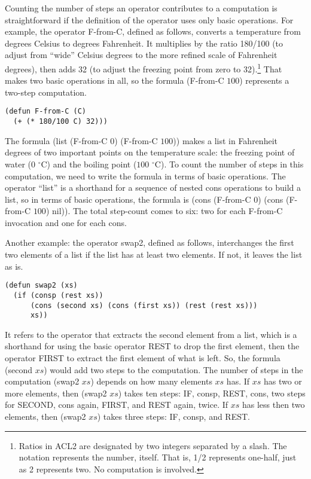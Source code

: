 Counting the number of steps an operator
contributes to a computation is straightforward
if the definition of the operator uses only basic operations.
For example, the operator F-from-C, defined
as follows, converts a temperature from degrees Celsius to
degrees Fahrenheit. It multiplies by the ratio 180/100
(to adjust from ``wide'' Celsius degrees to the
more refined scale of Fahrenheit degrees), then adds 32
(to adjust the freezing point from zero to 32).\footnote{Ratios
in ACL2 are designated
by two integers separated by a slash.
The notation represents the number, itself.
That is, 1/2 represents one-half, just as 2 represents two.
No computation is involved.}
That makes two basic operations in all, so the formula
(F-from-C $100$) represents a two-step computation.

\begin{Verbatim}
(defun F-from-C (C)
  (+ (* 180/100 C) 32)))
\end{Verbatim}

The formula (list (F-from-C $0$) (F-from-C $100$))
makes a list in Fahrenheit degrees of two important
points on the temperature scale:
the freezing point of water ($0$ $^\circ$C) and the boiling point ($100$ $^\circ$C).
To count the number of steps in this computation,
we need to write the formula in terms of basic operations.
The operator ``list'' is a shorthand for a sequence of nested
cons operations to build a list,
so in terms of basic operations, the formula is
(cons (F-from-C $0$) (cons (F-from-C $100$) nil)).
The total step-count comes to six: two for each F-from-C invocation
and one for each cons.

Another example:
the operator swap2, defined as follows, interchanges the
first two elements of a list if the list has at least two elements.
If not, it leaves the list as is.

\begin{Verbatim}
(defun swap2 (xs)
  (if (consp (rest xs))
      (cons (second xs) (cons (first xs)) (rest (rest xs)))
      xs))
\end{Verbatim}

It refers to the operator that extracts the second element from a list,
which is a shorthand for using the basic operator REST to drop the
first element, then the operator FIRST to extract the first element
of what is left.
\label{steps-in-second-op}
So, the formula (second $xs$) would add two steps
to the computation. The number of steps in the computation (swap2 $xs$)
depends on how many elements $xs$ has. If $xs$ has two or more elements,
then (swap2 $xs$) takes ten steps: IF, consp, REST, cons, two steps for SECOND,
cons again, FIRST, and REST again, twice.
If $xs$ has less then two elements, then (swap2 $xs$) takes three steps:
IF, consp, and REST.


